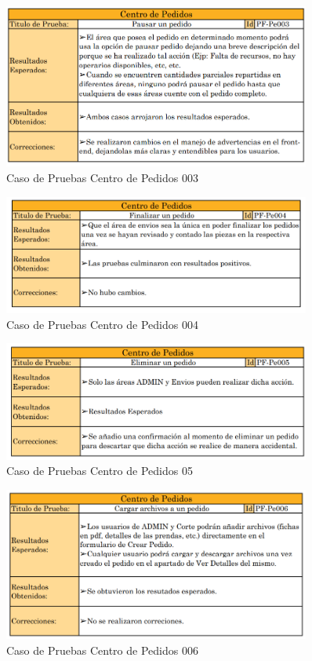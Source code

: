 \documentclass[12pt,letterpaper,spanish]{report}
\begin{document}
\begin{figure}[H]
  \centering
  \includegraphics[width=0.9\textwidth]{PF-Pe003.png}
  \caption{Caso de Pruebas Centro de Pedidos 003}\label{Pe003}
\end{figure}


\begin{figure}[H]
  \centering
  \includegraphics[width=0.9\textwidth]{PF-Pe004.png}
  \caption{Caso de Pruebas Centro de Pedidos 004}\label{Pe004}
\end{figure}


\begin{figure}[H]
  \centering
  \includegraphics[width=0.9\textwidth]{PF-Pe005.png}
  \caption{Caso de Pruebas Centro de Pedidos 05}\label{Pe005}
\end{figure}

\begin{figure}[H]
  \centering
  \includegraphics[width=0.9\textwidth]{PF-Pe006.png}
  \caption{Caso de Pruebas Centro de Pedidos 006}\label{Pe006}
\end{figure}
\end{document}
